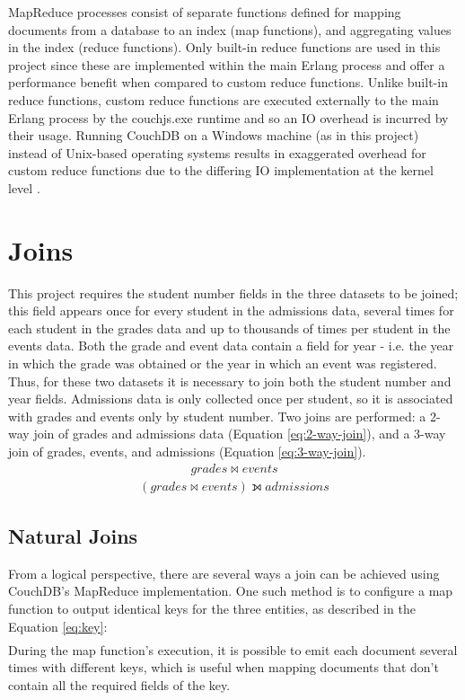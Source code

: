 MapReduce processes consist of separate functions defined for mapping documents from a database to an index (map functions), and aggregating values in the index (reduce functions). Only built-in reduce functions are used in this project since these are implemented within the main Erlang process and offer a performance benefit when compared to custom reduce functions. Unlike built-in reduce functions, custom reduce functions are executed externally to the main Erlang process by the couchjs.exe runtime and so  an IO overhead is incurred by their usage. Running CouchDB on a Windows machine (as in this project) instead of Unix-based operating systems results in exaggerated overhead for custom reduce functions due to the differing IO implementation at the kernel level \cite{slack1Nov}.

\section{Joins}
This project requires the student number fields in the three datasets to be joined; this field appears once for every student in the admissions data, several times for each student in the grades data and up to thousands of times per student in the events data. Both the grade and event data contain a field for year - i.e. the year in which the grade was obtained or the year in which an event was registered. Thus, for these two datasets it is necessary to join both the student number and year fields. Admissions data is only collected once per student, so it is associated with grades and events only by student number. Two joins are performed: a 2-way join of grades and admissions data (Equation \ref{eq:2-way-join}), and a 3-way join of grades, events, and admissions (Equation \ref{eq:3-way-join}).
\begin{align}
  grades \bowtie events\label{eq:2-way-join}
\end{align}
\begin{align}
  (grades \bowtie events) \leftouterjoin admissions\label{eq:3-way-join}
\end{align}

\subsection{Natural Joins}
From a logical perspective, there are several ways a join can be achieved using CouchDB's MapReduce implementation. One such method is to configure a map function to output identical keys for the three entities, as described in the Equation \ref{eq:key}:
\begin{align}
  [studentNumber,course,year]\label{eq:key}
\end{align}
During the map function’s execution, it is possible to emit each document several times with different keys, which is useful when mapping documents that don't contain all the required fields of the key.

